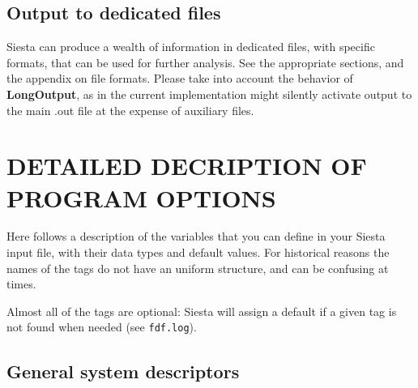 \documentclass[11pt]{article}
\begin{document}
\subsection{Output to dedicated files} 

{\sc Siesta} can produce a wealth of information in dedicated files,
with specific formats, that can be used for further analysis. See the
appropriate sections, and the appendix on file formats.
Please take into account the behavior of
{\bf LongOutput}, as in the current implementation might silently
activate output to the main .out file at the expense of auxiliary
files.

\section{DETAILED DECRIPTION OF PROGRAM OPTIONS}


Here follows a description of the variables that you can define in
your {\sc Siesta} input file, with their data types and default
values. For historical reasons the names of the tags do not have an
uniform structure, and can be confusing at times.

Almost all of the tags are optional: {\sc Siesta} will assign a
default if a given tag is not found when needed (see {\tt fdf.log}).


\vspace{5pt}
\subsection{General system descriptors}
\end{document}
